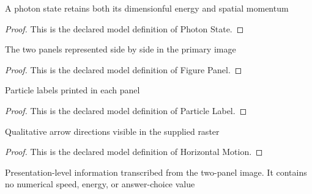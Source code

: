 \begin{definition}
  \label{def:physics:phyx-mini-0569:phyxminiproblems-problemphyxmini0569-photonstate}
  A photon state retains both its dimensionful energy and spatial momentum
\end{definition}
\begin{proof}
  This is the declared model definition of Photon State.
\end{proof}
\begin{definition}
  \label{def:physics:phyx-mini-0569:phyxminiproblems-problemphyxmini0569-figurepanel}
  The two panels represented side by side in the primary image
\end{definition}
\begin{proof}
  This is the declared model definition of Figure Panel.
\end{proof}
\begin{definition}
  \label{def:physics:phyx-mini-0569:phyxminiproblems-problemphyxmini0569-particlelabel}
  Particle labels printed in each panel
\end{definition}
\begin{proof}
  This is the declared model definition of Particle Label.
\end{proof}
\begin{definition}
  \label{def:physics:phyx-mini-0569:phyxminiproblems-problemphyxmini0569-horizontalmotion}
  Qualitative arrow directions visible in the supplied raster
\end{definition}
\begin{proof}
  This is the declared model definition of Horizontal Motion.
\end{proof}
\begin{definition}
  \label{def:physics:phyx-mini-0569:phyxminiproblems-problemphyxmini0569-photonelectronbackscatterfigure}
  Presentation-level information transcribed from the two-panel image. It contains no numerical speed, energy, or answer-choice value
\end{definition}
